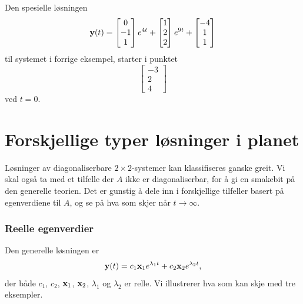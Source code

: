 \begin{ex}
Den spesielle løsningen 
\[
\mathbf{y}(t)=
\begin{bmatrix}
0 \\ -1 \\ 1
\end{bmatrix} e^{4t}
+
\begin{bmatrix}
1 \\ 2 \\ 2
\end{bmatrix}e^{9t}
+
\begin{bmatrix}
-4 \\ 1 \\ 1
\end{bmatrix}
\]
til systemet i forrige eksempel, starter i punktet 
\[
\begin{bmatrix}
-3 \\ 2 \\ 4
\end{bmatrix}
\]
ved $t=0$. \qedhere
\end{ex}


\section*{Forskjellige typer løsninger i planet}

Løsninger av diagonaliserbare $2 \times 2$-systemer kan klassifiseres ganske greit. 
Vi skal også ta med et tilfelle der $A$ ikke er diagonaliserbar, for å gi en smakebit på den generelle teorien. 
Det er gunstig å dele inn i forskjellige tilfeller basert på egenverdiene til $A$, og se på hva som skjer når $t \to \infty$.

\subsubsection*{Reelle egenverdier}
Den generelle løsningen er
\[
\mathbf{y}(t)=c_1\mathbf{x}_1e^{\lambda_1 t}+c_2\mathbf{x}_2e^{\lambda_2 t},
\]
der både $c_1$, $c_2$, $\mathbf{x}_1$, $\mathbf{x}_2$, $\lambda_1$ og $\lambda_2$ er relle. Vi illustrerer hva som kan skje med tre eksempler.

